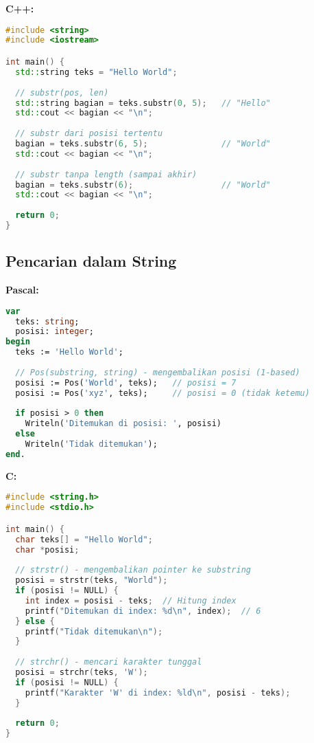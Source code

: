 \documentclass[../main.tex]{subfiles}
\begin{document}
\textbf{C++:}
\begin{lstlisting}[language=C++, caption={Substring di C++}]
#include <string>
#include <iostream>

int main() {
  std::string teks = "Hello World";
  
  // substr(pos, len)
  std::string bagian = teks.substr(0, 5);   // "Hello"
  std::cout << bagian << "\n";
  
  // substr dari posisi tertentu
  bagian = teks.substr(6, 5);               // "World"
  std::cout << bagian << "\n";
  
  // substr tanpa length (sampai akhir)
  bagian = teks.substr(6);                  // "World"
  std::cout << bagian << "\n";
  
  return 0;
}
\end{lstlisting}

\subsection{Pencarian dalam String}

\textbf{Pascal:}
\begin{lstlisting}[language=Pascal, caption={Pencarian di Pascal}]
var
  teks: string;
  posisi: integer;
begin
  teks := 'Hello World';
  
  // Pos(substring, string) - mengembalikan posisi (1-based)
  posisi := Pos('World', teks);   // posisi = 7
  posisi := Pos('xyz', teks);     // posisi = 0 (tidak ketemu)
  
  if posisi > 0 then
    Writeln('Ditemukan di posisi: ', posisi)
  else
    Writeln('Tidak ditemukan');
end.
\end{lstlisting}

\textbf{C:}
\begin{lstlisting}[language=C, caption={Pencarian di C}]
#include <string.h>
#include <stdio.h>

int main() {
  char teks[] = "Hello World";
  char *posisi;
  
  // strstr() - mengembalikan pointer ke substring
  posisi = strstr(teks, "World");
  if (posisi != NULL) {
    int index = posisi - teks;  // Hitung index
    printf("Ditemukan di index: %d\n", index);  // 6
  } else {
    printf("Tidak ditemukan\n");
  }
  
  // strchr() - mencari karakter tunggal
  posisi = strchr(teks, 'W');
  if (posisi != NULL) {
    printf("Karakter 'W' di index: %ld\n", posisi - teks);
  }
  
  return 0;
}
\end{lstlisting}
\end{document}
